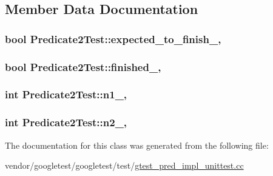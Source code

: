 \subsection{Member Data Documentation}
\subsubsection[{\texorpdfstring{expected\+\_\+to\+\_\+finish\+\_\+}{expected_to_finish_}}]{\setlength{\rightskip}{0pt plus 5cm}bool Predicate2\+Test\+::expected\+\_\+to\+\_\+finish\+\_\+\hspace{0.3cm}{\ttfamily [static]}, {\ttfamily [protected]}}\hypertarget{classPredicate2Test_a56cf1f0f556addd9a62e0644dc1a86fc}{}\label{classPredicate2Test_a56cf1f0f556addd9a62e0644dc1a86fc}
\subsubsection[{\texorpdfstring{finished\+\_\+}{finished_}}]{\setlength{\rightskip}{0pt plus 5cm}bool Predicate2\+Test\+::finished\+\_\+\hspace{0.3cm}{\ttfamily [static]}, {\ttfamily [protected]}}\hypertarget{classPredicate2Test_a30f4ef76d3004253078e767e5c653b85}{}\label{classPredicate2Test_a30f4ef76d3004253078e767e5c653b85}
\subsubsection[{\texorpdfstring{n1\+\_\+}{n1_}}]{\setlength{\rightskip}{0pt plus 5cm}int Predicate2\+Test\+::n1\+\_\+\hspace{0.3cm}{\ttfamily [static]}, {\ttfamily [protected]}}\hypertarget{classPredicate2Test_ac002d8e279b24e75906fd19973fc2170}{}\label{classPredicate2Test_ac002d8e279b24e75906fd19973fc2170}
\subsubsection[{\texorpdfstring{n2\+\_\+}{n2_}}]{\setlength{\rightskip}{0pt plus 5cm}int Predicate2\+Test\+::n2\+\_\+\hspace{0.3cm}{\ttfamily [static]}, {\ttfamily [protected]}}\hypertarget{classPredicate2Test_a9dbe5173570b9b911af2df889c287027}{}\label{classPredicate2Test_a9dbe5173570b9b911af2df889c287027}


The documentation for this class was generated from the following file\+:\begin{DoxyCompactItemize}
\item 
vendor/googletest/googletest/test/\hyperlink{gtest__pred__impl__unittest_8cc}{gtest\+\_\+pred\+\_\+impl\+\_\+unittest.\+cc}\end{DoxyCompactItemize}
